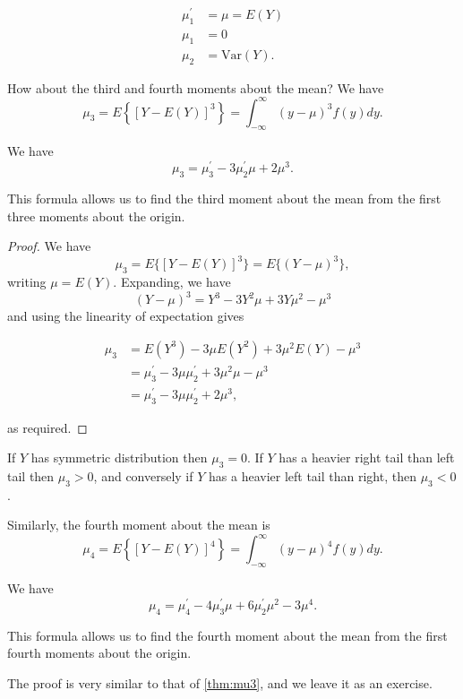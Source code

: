 \documentclass[]{book}
\theoremstyle{definition}
\theoremstyle{definition}
\theoremstyle{definition}
\theoremstyle{remark}
\let\BeginKnitrBlock\begin \let\EndKnitrBlock\end
\begin{document}
\begin{align*}
\mu_1^\prime &= \mu = E(Y) \\
\mu_1 &= 0 \\
\mu_2 &= \text{Var}(Y).
\end{align*}

How about the third and fourth moments about the mean? We have
\[\mu_3 = E\left\{[Y - E(Y)]^3\right\} = \int_{-\infty}^\infty (y - \mu)^3 f(y) dy.\]

\BeginKnitrBlock{theorem}
\protect\hypertarget{thm:mu3}{}{\label{thm:mu3} }We have
\[\mu_3 = \mu_3^\prime - 3 \mu_2^\prime \mu + 2 \mu^3.\]
\EndKnitrBlock{theorem} \BeginKnitrBlock{remark}

\iffalse{} {Remark. } \fi{}This formula allows us to find the third
moment about the mean from the first three moments about the origin.
\EndKnitrBlock{remark} \BeginKnitrBlock{proof}

\iffalse{} {Proof. } \fi{}We have
\[\mu_3 = E\{[Y - E(Y)]^3\} = E\{(Y - \mu)^3\},\] writing
\(\mu = E(Y)\). Expanding, we have
\[(Y - \mu)^3 = Y^3 - 3 Y^2 \mu + 3 Y \mu^2  - \mu^3\] and using the
linearity of expectation gives

\begin{align*}
\mu_3 &= E(Y^3) - 3 \mu E(Y^2) + 3 \mu^2 E(Y) - \mu^3 \\
&= \mu_3^\prime - 3 \mu \mu_2^\prime + 3 \mu^2 \mu - \mu^3 \\
&= \mu_3^\prime - 3 \mu \mu_2^\prime + 2 \mu^3,
\end{align*}

as required.
\EndKnitrBlock{proof}

If \(Y\) has symmetric distribution then \(\mu_3 = 0\). If \(Y\) has a
heavier right tail than left tail then \(\mu_3 > 0\), and conversely if
\(Y\) has a heavier left tail than right, then \(\mu_3 < 0\).

Similarly, the fourth moment about the mean is
\[\mu_4 =  E\left\{[Y - E(Y)]^4\right\} = \int_{-\infty}^\infty (y - \mu)^4 f(y) dy.\]
\BeginKnitrBlock{theorem}
\protect\hypertarget{thm:mu4}{}{\label{thm:mu4} }We have
\[\mu_4 = \mu_4^\prime - 4 \mu_3^\prime  \mu + 6 \mu_2^\prime \mu^2 - 3 \mu^4.\]
\EndKnitrBlock{theorem} \BeginKnitrBlock{remark}

\iffalse{} {Remark. } \fi{}This formula allows us to find the fourth
moment about the mean from the first fourth moments about the origin.
\EndKnitrBlock{remark} The proof is very similar to that of
\ref{thm:mu3}, and we leave it as an exercise.
\end{document}
